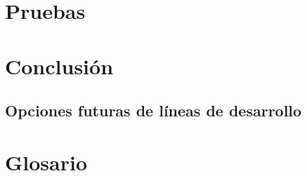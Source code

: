 \documentclass[11pt,spanish,listoffigures,listoftables]{tfgetsinf}
\begin{document}
\chapter{Pruebas}

\chapter{Conclusión}


\section{Opciones futuras de líneas de desarrollo}

\nocite{*}
\printbibliography

\cleardoublepage

\APPENDIX

\chapter{Glosario}
\end{document}
